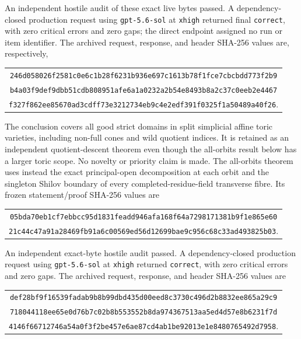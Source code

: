 An independent hostile audit of these exact live bytes passed.  A
dependency-closed production request using \texttt{gpt-5.6-sol} at
\texttt{xhigh} returned final \texttt{correct}, with zero critical errors
and zero gaps; the direct endpoint assigned no run or item identifier.  The
archived request, response, and header SHA-256 values are, respectively,
\begin{center}
\small
\begin{tabular}{@{}c@{}}
\nolinkurl{246d058026f2581c0e6c1b28f6231b936e697c1613b78f1fce7cbcbdd773f2b9}\\
\nolinkurl{b4a03f9def9dbb51cdb808951afe6a1a0232a2b54e8493b8a2c37c0eeb2e4467}\\
\nolinkurl{f327f862ee85670ad3cdff73e3212734eb9c4e2edf391f0325f1a50489a40f26}.
\end{tabular}
\end{center}
The conclusion covers all good strict domains in split simplicial affine
toric varieties, including non-full cones and wild quotient indices.  It is
retained as an independent quotient-descent theorem even though the
all-orbits result below has a larger toric scope.  No novelty or priority
claim is made.
The all-orbits theorem
uses instead the exact principal-open decomposition at each orbit and the
singleton Shilov boundary of every completed-residue-field transverse
fibre.  Its frozen statement/proof SHA-256 values are
\begin{center}
\small
\begin{tabular}{@{}c@{}}
\nolinkurl{05bda70eb1cf7ebbcc95d1831feadd946afa168f64a7298171381b9f1e865e60}\\
\nolinkurl{21c44c47a91a28469fb91a6c00569ed56d12699bae9c956c68c33ad493825b03}.
\end{tabular}
\end{center}
An independent exact-byte hostile audit passed.  A dependency-closed
production request using \texttt{gpt-5.6-sol} at \texttt{xhigh} returned
\texttt{correct}, with zero critical errors and zero gaps.  The archived
request, response, and header SHA-256 values are
\begin{center}
\small
\begin{tabular}{@{}c@{}}
\nolinkurl{def28bf9f16539fadab9b8b99dbd435d00eed8c3730c496d2b8832ee865a29c9}\\
\nolinkurl{718044118ee65e0d76b7c02b8b553552b8da974367513aa5ed4d57e8b6231f7d}\\
\nolinkurl{4146f66712746a54a0f3f2be457e6ae87cd4ab1be92013e1e8480765492d7958}.
\end{tabular}
\end{center}
